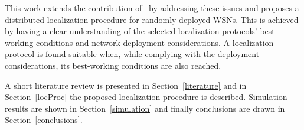 This work extends the contribution of~\cite{composability} by addressing these issues and proposes a distributed localization procedure for randomly deployed WSNs. This is achieved by having a clear understanding of the selected localization protocols' best-working conditions and network deployment considerations. A localization protocol is found suitable when, while complying with the deployment considerations, its best-working conditions are also reached.

A short literature review is presented in Section~\ref{literature} and in Section~\ref{locProc} the proposed localization procedure is described. Simulation results are shown in Section~\ref{simulation} and finally conclusions are drawn in Section~\ref{conclusions}.